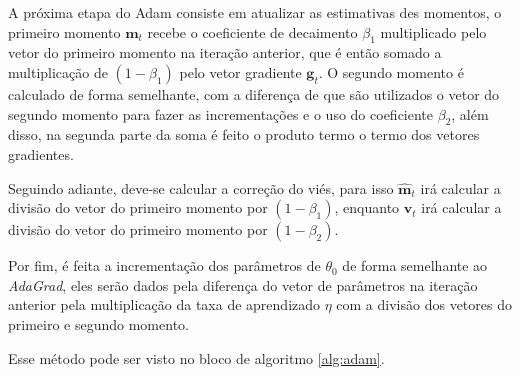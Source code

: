 A próxima etapa do Adam consiste em atualizar as estimativas des momentos, o primeiro momento $\mathbf{m}_t$ recebe o coeficiente de decaimento $\beta_1$ multiplicado pelo vetor do primeiro momento na iteração anterior, que é então somado a multiplicação de $(1 - \beta_1)$ pelo vetor gradiente $\mathbf{g}_t$. O segundo momento é calculado de forma semelhante, com a diferença de que são utilizados o vetor do segundo momento para fazer as incrementações e o uso do coeficiente $\beta_2$, além disso, na segunda parte da soma é feito o produto termo o termo dos vetores gradientes.

Seguindo adiante, deve-se calcular a correção do viés, para isso $\mathbf{\hat{m}}_t$ irá calcular a divisão do vetor do primeiro momento por $(1 - \beta_1)$, enquanto $\mathbf{\hat{v}}_t$ irá calcular a divisão do vetor do primeiro momento por $(1 - \beta_2)$.

Por fim, é feita a incrementação dos parâmetros de $\theta_0$ de forma semelhante ao \textit{AdaGrad}, eles serão dados pela diferença do vetor de parâmetros na iteração anterior pela multiplicação da taxa de aprendizado $\eta$ com a divisão dos vetores do primeiro e segundo momento.

Esse método pode ser visto no bloco de algoritmo \ref{alg:adam}.

